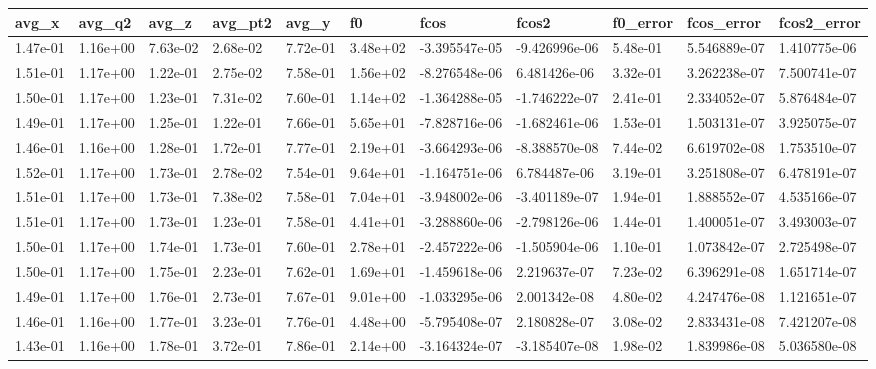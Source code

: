 \begin{longtable}{| p{} | p{} |}
\toprule
   avg\_x &   avg\_q2 &    avg\_z &  avg\_pt2 &    avg\_y &       f0 &          fcos &         fcos2 &  f0\_error &    fcos\_error &   fcos2\_error \\
\midrule
1.47e-01 & 1.16e+00 & 7.63e-02 & 2.68e-02 & 7.72e-01 & 3.48e+02 & -3.395547e-05 & -9.426996e-06 &  5.48e-01 &  5.546889e-07 &  1.410775e-06 \\
1.51e-01 & 1.17e+00 & 1.22e-01 & 2.75e-02 & 7.58e-01 & 1.56e+02 & -8.276548e-06 &  6.481426e-06 &  3.32e-01 &  3.262238e-07 &  7.500741e-07 \\
1.50e-01 & 1.17e+00 & 1.23e-01 & 7.31e-02 & 7.60e-01 & 1.14e+02 & -1.364288e-05 & -1.746222e-07 &  2.41e-01 &  2.334052e-07 &  5.876484e-07 \\
1.49e-01 & 1.17e+00 & 1.25e-01 & 1.22e-01 & 7.66e-01 & 5.65e+01 & -7.828716e-06 & -1.682461e-06 &  1.53e-01 &  1.503131e-07 &  3.925075e-07 \\
1.46e-01 & 1.16e+00 & 1.28e-01 & 1.72e-01 & 7.77e-01 & 2.19e+01 & -3.664293e-06 & -8.388570e-08 &  7.44e-02 &  6.619702e-08 &  1.753510e-07 \\
1.52e-01 & 1.17e+00 & 1.73e-01 & 2.78e-02 & 7.54e-01 & 9.64e+01 & -1.164751e-06 &  6.784487e-06 &  3.19e-01 &  3.251808e-07 &  6.478191e-07 \\
1.51e-01 & 1.17e+00 & 1.73e-01 & 7.38e-02 & 7.58e-01 & 7.04e+01 & -3.948002e-06 & -3.401189e-07 &  1.94e-01 &  1.888552e-07 &  4.535166e-07 \\
1.51e-01 & 1.17e+00 & 1.73e-01 & 1.23e-01 & 7.58e-01 & 4.41e+01 & -3.288860e-06 & -2.798126e-06 &  1.44e-01 &  1.400051e-07 &  3.493003e-07 \\
1.50e-01 & 1.17e+00 & 1.74e-01 & 1.73e-01 & 7.60e-01 & 2.78e+01 & -2.457222e-06 & -1.505904e-06 &  1.10e-01 &  1.073842e-07 &  2.725498e-07 \\
1.50e-01 & 1.17e+00 & 1.75e-01 & 2.23e-01 & 7.62e-01 & 1.69e+01 & -1.459618e-06 &  2.219637e-07 &  7.23e-02 &  6.396291e-08 &  1.651714e-07 \\
1.49e-01 & 1.17e+00 & 1.76e-01 & 2.73e-01 & 7.67e-01 & 9.01e+00 & -1.033295e-06 &  2.001342e-08 &  4.80e-02 &  4.247476e-08 &  1.121651e-07 \\
1.46e-01 & 1.16e+00 & 1.77e-01 & 3.23e-01 & 7.76e-01 & 4.48e+00 & -5.795408e-07 &  2.180828e-07 &  3.08e-02 &  2.833431e-08 &  7.421207e-08 \\
1.43e-01 & 1.16e+00 & 1.78e-01 & 3.72e-01 & 7.86e-01 & 2.14e+00 & -3.164324e-07 & -3.185407e-08 &  1.98e-02 &  1.839986e-08 &  5.036580e-08 \\

\end{longtable}
